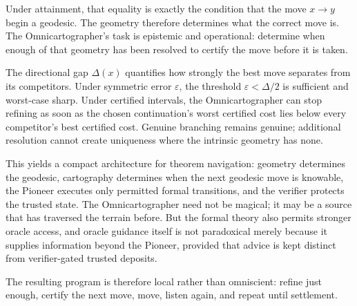 \documentclass[11pt]{article}
\theoremstyle{definition}
\theoremstyle{remark}
\newcommand{\Gap}{\Delta}
\newcommand{\eps}{\varepsilon}
\begin{document}
Under attainment, that equality is exactly the condition that the move $x\to y$ begin a geodesic. The geometry therefore determines what the correct move is. The Omnicartographer's task is epistemic and operational: determine when enough of that geometry has been resolved to certify the move before it is taken.

The directional gap $\Gap(x)$ quantifies how strongly the best move separates from its competitors. Under symmetric error $\eps$, the threshold $\eps<\Gap/2$ is sufficient and worst-case sharp. Under certified intervals, the Omnicartographer can stop refining as soon as the chosen continuation's worst certified cost lies below every competitor's best certified cost. Genuine branching remains genuine; additional resolution cannot create uniqueness where the intrinsic geometry has none.

This yields a compact architecture for theorem navigation: geometry determines the geodesic, cartography determines when the next geodesic move is knowable, the Pioneer executes only permitted formal transitions, and the verifier protects the trusted state. The Omnicartographer need not be magical; it may be a source that has traversed the terrain before. But the formal theory also permits stronger oracle access, and oracle guidance itself is not paradoxical merely because it supplies information beyond the Pioneer, provided that advice is kept distinct from verifier-gated trusted deposits.

The resulting program is therefore local rather than omniscient: refine just enough, certify the next move, move, listen again, and repeat until settlement.
\end{document}
